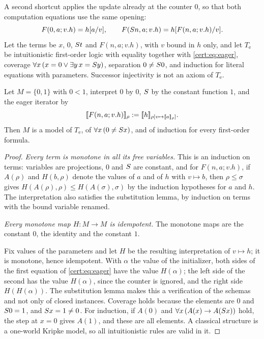 A second shortcut applies the update already at the counter $0$, so that both
computation equations use the same opening:
\begin{equation}\label{cert:eq:eager}
F(0,a;v.h)=h[a/v],\qquad F(S n,a;v.h)=h[F(n,a;v.h)/v].
\end{equation}
Let the terms be $x$, $0$, $S t$ and $F(n,a;v.h)$, with $v$ bound in $h$
only, and let $T_{\mathrm e}$ be intuitionistic first-order logic with
equality together with \eqref{cert:eq:eager}, coverage
$\forall x\,(x=0\lor\exists y\,x=S y)$, separation $0\neq S 0$, and
induction for literal equations with parameters. Successor injectivity is not
an axiom of $T_{\mathrm e}$.

\begin{theorem}\label{cert:thm:eager}
Let $M=\{0,1\}$ with $0<1$, interpret $0$ by $0$, $S$ by the constant
function $1$, and the eager iterator by
\[
[\![F(n,a;v.h)]\!]_{\rho}\mathrel{:=}[\![h]\!]_{\rho[v\mapsto[\![a]\!]_{\rho}]}.
\]
Then $M$ is a model of $T_{\mathrm e}$, of $\forall x\,(0\neq S x)$, and of
induction for every first-order formula.
\end{theorem}
\begin{proof}
\emph{Every term is monotone in all its free variables.} This is an induction
on terms: variables are projections, $0$ and $S$ are constant, and for
$F(n,a;v.h)$, if $A(\rho)$ and $H(b,\rho)$ denote the values of $a$ and of
$h$ with $v\mapsto b$, then $\rho\le\sigma$ gives
$H(A(\rho),\rho)\le H(A(\sigma),\sigma)$ by the induction hypotheses for $a$
and $h$. The interpretation also satisfies the substitution lemma, by
induction on terms with the bound variable renamed.

\emph{Every monotone map $H\colon M\to M$ is idempotent.} The monotone maps
are the constant $0$, the identity and the constant $1$.

Fix values of the parameters and let $H$ be the resulting interpretation of
$v\mapsto h$; it is monotone, hence idempotent. With $\alpha$ the value of the
initializer, both sides of the first equation of \eqref{cert:eq:eager} have
the value $H(\alpha)$; the left side of the second has the value $H(\alpha)$,
since the counter is ignored, and the right side $H(H(\alpha))$. The
substitution lemma makes this a verification of the schemas and not only of
closed instances. Coverage holds because the elements are $0$ and
$S 0=1$, and $S x=1\neq 0$. For induction, if $A(0)$ and
$\forall x\,(A(x)\to A(S x))$ hold, the step at $x=0$ gives $A(1)$, and
these are all elements. A classical structure is a one-world Kripke model, so
all intuitionistic rules are valid in it.
\end{proof}


